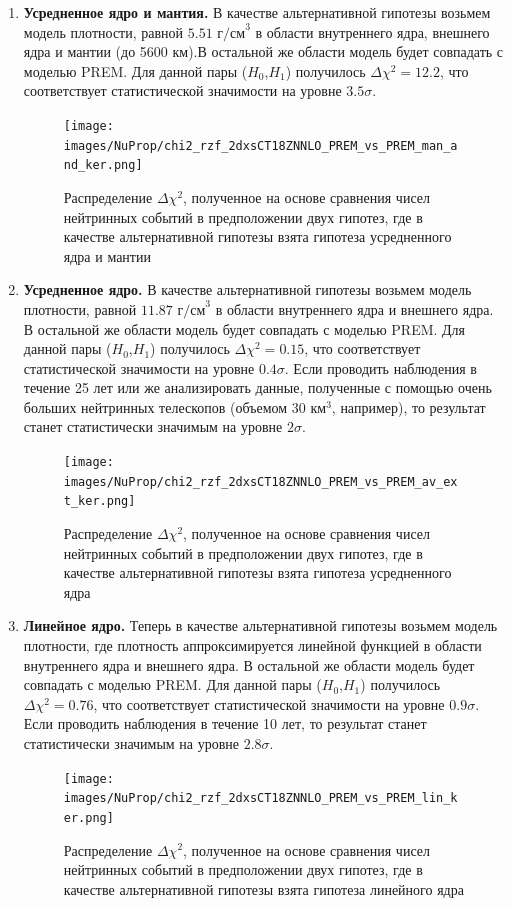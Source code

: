 \begin{enumerate}
    \item \textbf{Усредненное ядро и мантия.} В качестве альтернативной гипотезы возьмем модель плотности, равной $5.51\text{ г/см}^3$ в области внутреннего ядра, внешнего ядра и мантии (до 5600 км).В остальной же области модель будет совпадать с моделью PREM. Для данной пары ($H_0$,$H_1$) получилось $\Delta\chi^2 = 12.2$, что соответствует статистической значимости на уровне $3.5\sigma$.   
    \begin{figure}[!h]
    \centering
    \texttt{[image: images/NuProp/chi2\_rzf\_2dxsCT18ZNNLO\_PREM\_vs\_PREM\_man\_and\_ker.png]}
    \caption{Распределение $\Delta\chi^2$, полученное на основе сравнения чисел нейтринных событий в предположении двух гипотез, где в качестве альтернативной гипотезы взята гипотеза усредненного ядра и мантии}
    \label{NuTom1}
    \end{figure}
    \item \textbf{Усредненное ядро.} В качестве альтернативной гипотезы возьмем модель плотности, равной $11.87\text{ г/см}^3$ в области внутреннего ядра и внешнего ядра. В остальной же области модель будет совпадать с моделью PREM. Для данной пары ($H_0$,$H_1$) получилось $\Delta\chi^2 = 0.15$, что соответствует статистической значимости на уровне $0.4\sigma$. Если проводить наблюдения в течение 25 лет или же анализировать данные, полученные с помощью очень больших нейтринных телескопов (объемом $30 \text{ км}^3$, например), то результат станет статистически значимым на уровне $2\sigma$.   
    \begin{figure}[!h]
    \centering
    \texttt{[image: images/NuProp/chi2\_rzf\_2dxsCT18ZNNLO\_PREM\_vs\_PREM\_av\_ext\_ker.png]}
    \caption{Распределение $\Delta\chi^2$, полученное на основе сравнения чисел нейтринных событий в предположении двух гипотез, где в качестве альтернативной гипотезы взята гипотеза усредненного ядра}
    \label{NuTom2}
    \end{figure}
    \item \textbf{Линейное ядро.} Теперь в качестве альтернативной гипотезы возьмем модель плотности,  где плотность аппроксимируется линейной функцией в области внутреннего ядра и внешнего ядра. В остальной же области модель будет совпадать с моделью PREM. Для данной пары ($H_0$,$H_1$) получилось $\Delta\chi^2 = 0.76$, что соответствует статистической значимости на уровне $0.9\sigma$. Если проводить наблюдения в течение 10 лет, то результат станет статистически значимым на уровне $2.8\sigma$. 
    \begin{figure}[!h]
    \centering
    \texttt{[image: images/NuProp/chi2\_rzf\_2dxsCT18ZNNLO\_PREM\_vs\_PREM\_lin\_ker.png]}
    \caption{Распределение $\Delta\chi^2$, полученное на основе сравнения чисел нейтринных событий в предположении двух гипотез, где в качестве альтернативной гипотезы взята гипотеза линейного ядра}
    \label{NuTom3}
    \end{figure}
\end{enumerate}
